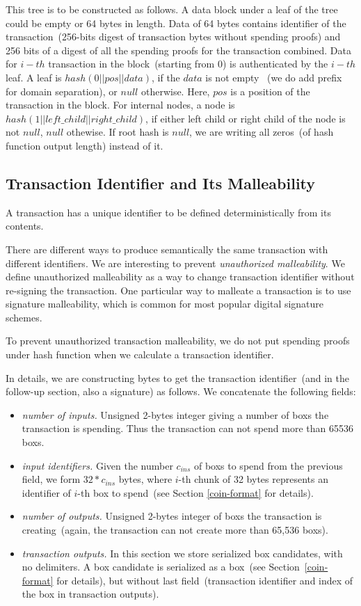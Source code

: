 \documentclass[]{article}   %
\newcommand{\coin}{box}
\begin{document}
This tree is to be constructed as follows. A data block under a leaf of the tree could be empty or 64 bytes in length.
Data of 64 bytes contains identifier of the transaction~(256-bits digest of transaction bytes without spending proofs)
and 256 bits of a digest of all the spending proofs for the transaction combined. Data for $i-th$ transaction
in the block~(starting from 0) is authenticated by the $i-th$ leaf.
A leaf is $hash(0 || pos || data)$, if the $data$ is not empty
~(we do add prefix for domain separation), or $null$ otherwise. Here, $pos$ is a position of the transaction in the block.
 For internal nodes, a node is $hash(1 || left\_child || right\_child)$, if either left child or right child of the
 node is not $null$, $null$ othewise. If root hash is $null$, we are writing all zeros~(of hash function output length)
 instead of it.


\subsection{Transaction Identifier and Its Malleability}
\label{tx-identifier}

A transaction has a unique identifier to be defined deterministically from its contents.

There are different ways to produce semantically the same transaction with different identifiers. We are interesting
to prevent {\em unauthorized malleability}. We define unauthorized malleability as a way to change transaction
identifier without re-signing the transaction. One particular way to malleate a transaction is to use signature
malleability, which is common for most popular digital signature schemes.

To prevent unauthorized transaction malleability, we do not put spending proofs under hash function when we calculate a
transaction identifier.

In details, we are constructing bytes to get the transaction identifier~(and in the follow-up section, also a signature)
as follows. We concatenate the following fields:

\begin{itemize}
    \item{\em number of inputs.} Unsigned 2-bytes integer giving a number of \coin{}s the transaction is spending. Thus
    the transaction can not spend more than 65536 \coin{}s.
    \item{\em input identifiers.} Given the number $c_{ins}$ of \coin{}s to spend from the previous field, we form
    $32 * c_{ins}$ bytes, where $i$-th chunk of 32 bytes represents an identifier of $i$-th \coin{} to spend~(see Section
    \ref{coin-format} for details).
    \item{\em number of outputs.} Unsigned 2-bytes integer of \coin{}s the transaction is creating~(again, the
    transaction can not create more than 65,536 \coin{}s).
    \item{\em transaction outputs.} In this section we store serialized \coin{} candidates, with no delimiters. A \coin{}
    candidate is serialized as a \coin{}~(see Section~\ref{coin-format} for details), but without last field~(transaction
    identifier and index of the \coin{} in transaction outputs).
\end{itemize}
\end{document}

